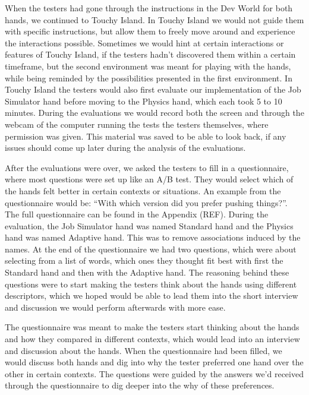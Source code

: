 When the testers had gone through the instructions in the Dev World for both hands, we continued to Touchy Island. In Touchy Island we would not guide them with specific instructions, but allow them to freely move around and experience the interactions possible. Sometimes we would hint at certain interactions or features of Touchy Island, if the testers hadn't discovered them within a certain timeframe, but the second environment was meant for playing with the hands, while being reminded by the possibilities presented in the first environment. In Touchy Island the testers would also first evaluate our implementation of the Job Simulator hand before moving to the Physics hand, which each took 5 to 10 minutes. During the evaluations we would record both the screen and through the webcam of the computer running the tests the testers themselves, where permission was given. This material was saved to be able to look back, if any issues should come up later during the analysis of the evaluations.

After the evaluations were over, we asked the testers to fill in a questionnaire, where most questions were set up like an A/B test. They would select which of the hands felt better in certain contexts or situations. An example from the questionnaire would be: “With which version did you prefer pushing things?”. The full questionnaire can be found in the Appendix (REF). During the evaluation, the Job Simulator hand was named Standard hand and the Physics hand was named Adaptive hand. This was to remove associations induced by the names. At the end of the questionnaire we had two questions, which were about selecting from a list of words, which ones they thought fit best with first the Standard hand and then with the Adaptive hand. The reasoning behind these questions were to start making the testers think about the hands using different descriptors, which we hoped would be able to lead them into the short interview and discussion we would perform afterwards with more ease.

The questionnaire was meant to make the testers start thinking about the hands and how they compared in different contexts, which would lead into an interview and discussion about the hands. When the questionnaire had been filled, we would discuss both hands and dig into why the tester preferred one hand over the other in certain contexts. The questions were guided by the answers we'd received through the questionnaire to dig deeper into the why of these preferences.

